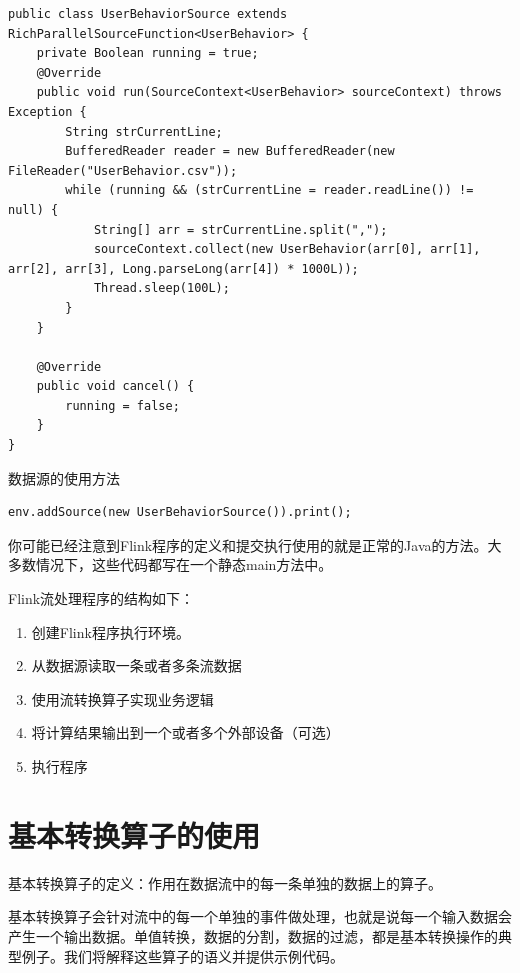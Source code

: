 \documentclass[cn,11pt,chinese]{elegantbook}
\begin{document}
\begin{verbatim}
public class UserBehaviorSource extends RichParallelSourceFunction<UserBehavior> {
    private Boolean running = true;
    @Override
    public void run(SourceContext<UserBehavior> sourceContext) throws Exception {
        String strCurrentLine;
        BufferedReader reader = new BufferedReader(new FileReader("UserBehavior.csv"));
        while (running && (strCurrentLine = reader.readLine()) != null) {
            String[] arr = strCurrentLine.split(",");
            sourceContext.collect(new UserBehavior(arr[0], arr[1], arr[2], arr[3], Long.parseLong(arr[4]) * 1000L));
            Thread.sleep(100L);
        }
    }
    
    @Override
    public void cancel() {
        running = false;
    }
}
\end{verbatim}

数据源的使用方法

\begin{verbatim}
env.addSource(new UserBehaviorSource()).print();
\end{verbatim}

你可能已经注意到Flink程序的定义和提交执行使用的就是正常的Java的方法。大多数情况下，这些代码都写在一个静态main方法中。

Flink流处理程序的结构如下：

\begin{enumerate}
    \item 创建Flink程序执行环境。
    \item 从数据源读取一条或者多条流数据
    \item 使用流转换算子实现业务逻辑
    \item 将计算结果输出到一个或者多个外部设备（可选）
    \item 执行程序
\end{enumerate}

\section{基本转换算子的使用}

基本转换算子的定义：作用在数据流中的每一条单独的数据上的算子。

基本转换算子会针对流中的每一个单独的事件做处理，也就是说每一个输入数据会产生一个输出数据。单值转换，数据的分割，数据的过滤，都是基本转换操作的典型例子。我们将解释这些算子的语义并提供示例代码。
\end{document}
